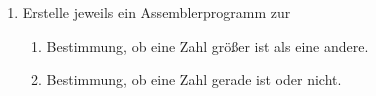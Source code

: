 \documentclass{lehramt-informatik-haupt}
\begin{document}
\begin{enumerate}
\begin{enumerate}
\begin{multicols}{2}
\begin{verbatim}
PROGRAM addition;
VAR x;
BEGIN
  x := x + 2;
END addition.
\end{verbatim}
\end{multicols}

%

\item {}

\begin{multicols}{2}
\begin{verbatim}
   LOAD x
   ADD y
   STORE x
   HOLD
x: WORD 0
y: WORD 0
\end{verbatim}

\columnbreak

\begin{verbatim}
PROGRAM addition;
VAR x, y;
BEGIN
  x := x + y;
END addition.
\end{verbatim}
\end{multicols}
\end{enumerate}

%

\item Erstelle jeweils ein Assemblerprogramm zur

\begin{enumerate}

%

\item Bestimmung, ob eine Zahl größer ist als eine andere.

%

\item Bestimmung, ob eine Zahl gerade ist oder nicht.
\end{enumerate}
\end{enumerate}

\literatur
\end{document}
